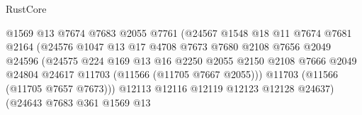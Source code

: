 \begin{lexlean}{RustCore}
\begin{coremodule}
                                        @1569
                                        @13
                                        @7674
                                        @7683
                                        @2055
                                        @7761
                                        (@24567
                                          @1548
                                          @18
                                          @11
                                          @7674
                                          @7681
                                          @2164
                                          (@24576
                                            @1047
                                            @13
                                            @17
                                            @4708
                                            @7673
                                            @7680
                                            @2108
                                            @7656
                                            @2049
                                            @24596
                                            (@24575
                                              @224
                                              @169
                                              @13
                                              @16
                                              @2250
                                              @2055
                                              @2150
                                              @2108
                                              @7666
                                              @2049
                                              @24804
                                              @24617
                                              @11703
                                              (@11566 (@11705 @7667 @2055)))
                                            @11703
                                            (@11566 (@11705 @7657 @7673)))
                                          @12113
                                          @12116
                                          @12119
                                          @12123
                                          @12128
                                          @24637)
                                        (@24643
                                          @7683
                                          @361
                                          @1569
                                          @13

\end{coremodule}
\end{lexlean}
